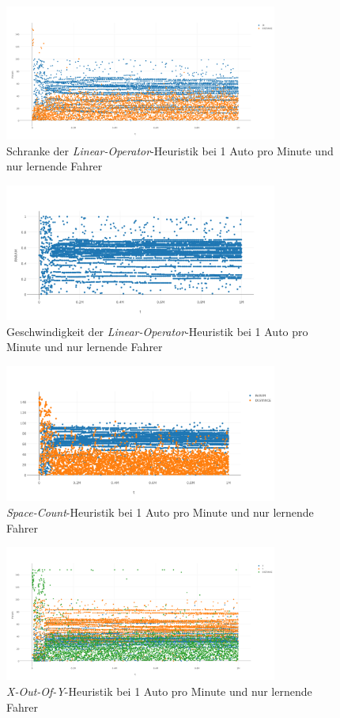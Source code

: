 \begin{figure}[H]
	\includegraphics[width=0.8\textwidth]{analyse/JustHeuristik/1pm/linop.png}
	\caption{Schranke der \emph{Linear-Operator}-Heuristik bei 1 Auto pro Minute und nur lernende Fahrer}\label{fig:ap_jh_loz_1}
\end{figure}
\begin{figure}[H]
	\includegraphics[width=0.8\textwidth]{analyse/JustHeuristik/1pm/linopa1just.png}
	\caption{Geschwindigkeit der \emph{Linear-Operator}-Heuristik bei 1 Auto pro Minute und nur lernende Fahrer}\label{fig:ap_jh_loa_1}
\end{figure}
\begin{figure}[H]
	\includegraphics[width=0.8\textwidth]{analyse/JustHeuristik/1pm/space1just.png}
	\caption{\emph{Space-Count}-Heuristik bei 1 Auto pro Minute und nur lernende Fahrer}\label{fig:ap_jh_sc_1}
\end{figure}
\begin{figure}[H]
	\includegraphics[width=0.8\textwidth]{analyse/JustHeuristik/1pm/xy.png}
	\caption{\emph{X-Out-Of-Y}-Heuristik bei 1 Auto pro Minute und nur lernende Fahrer}\label{fig:ap_jh_xy_1}
\end{figure}
